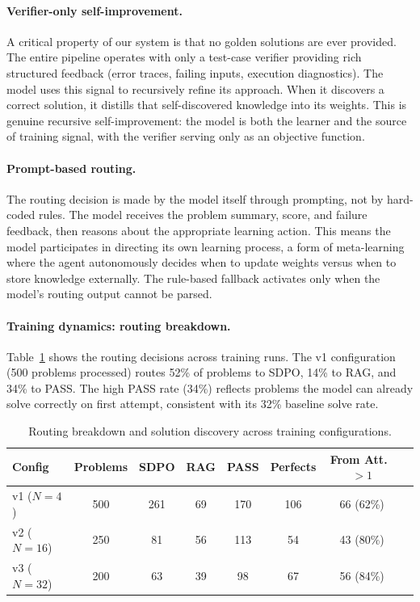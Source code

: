 \documentclass[11pt]{article}
\begin{document}
\paragraph{Verifier-only self-improvement.} A critical property of our system is that no golden solutions are ever provided. The entire pipeline operates with only a test-case verifier providing rich structured feedback (error traces, failing inputs, execution diagnostics). The model uses this signal to recursively refine its approach. When it discovers a correct solution, it distills that self-discovered knowledge into its weights. This is genuine recursive self-improvement: the model is both the learner and the source of training signal, with the verifier serving only as an objective function.

\paragraph{Prompt-based routing.} The routing decision is made by the model itself through prompting, not by hard-coded rules. The model receives the problem summary, score, and failure feedback, then reasons about the appropriate learning action. This means the model participates in directing its own learning process, a form of meta-learning where the agent autonomously decides when to update weights versus when to store knowledge externally. The rule-based fallback activates only when the model's routing output cannot be parsed.

\paragraph{Training dynamics: routing breakdown.} Table~\ref{tab:routing} shows the routing decisions across training runs. The v1 configuration (500 problems processed) routes 52\% of problems to SDPO, 14\% to RAG, and 34\% to PASS. The high PASS rate (34\%) reflects problems the model can already solve correctly on first attempt, consistent with its 32\% baseline solve rate.

\begin{table}[h]
\centering
\begin{tabular}{lccccccc}
\toprule
\textbf{Config} & \textbf{Problems} & \textbf{SDPO} & \textbf{RAG} & \textbf{PASS} & \textbf{Perfects} & \textbf{From Att.\ $>1$} \\
\midrule
v1 ($N{=}4$)  & 500 & 261 & 69 & 170 & 106 & 66 (62\%) \\
v2 ($N{=}16$) & 250 & 81  & 56 & 113 & 54  & 43 (80\%) \\
v3 ($N{=}32$) & 200 & 63  & 39 & 98  & 67  & 56 (84\%) \\
\bottomrule
\end{tabular}
\caption{Routing breakdown and solution discovery across training configurations.}
\label{tab:routing}
\end{table}
\end{document}
